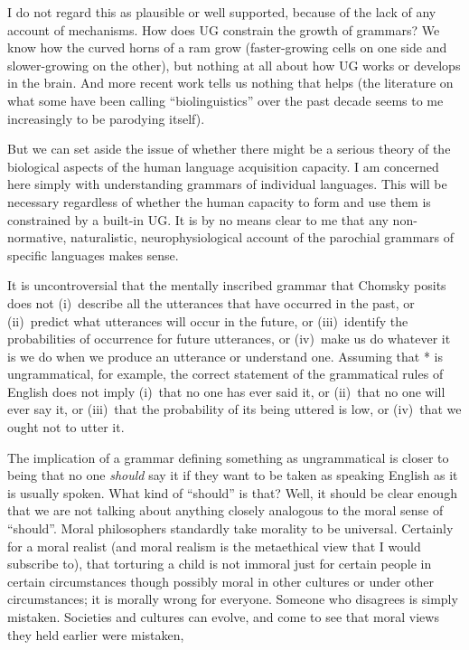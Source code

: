 \documentclass[output=paper]{langscibook}
\begin{document}
I do not regard this as plausible or well supported, because of the lack of any account of mechanisms.  How does UG constrain the growth of grammars? We know how the curved horns of a ram grow (faster-growing cells on one side and slower-growing on the other), but nothing at all about how UG works or develops in the brain. And more recent work tells us nothing that helps (the literature on what some have been calling ``biolinguistics'' over the past decade seems to me increasingly to be parodying itself).

But we can set aside the issue of whether there might be a serious theory of the biological aspects of the human language acquisition capacity. I am concerned here simply with understanding grammars of individual languages. This will be necessary regardless of whether the human capacity to form and use them is constrained by a built-in UG.  It is by no means clear to me that any non-normative, naturalistic, neurophysiological account of the parochial grammars of specific languages makes sense.

It is uncontroversial that the mentally inscribed grammar that Chomsky posits does not (i)~describe all the utterances that have occurred in the past, or (ii)~predict what utterances will occur in the future, or (iii)~identify the probabilities of occurrence for future utterances, or (iv)~make us do whatever it is we do when we produce an utterance or understand one.  Assuming that * is ungrammatical, for example, the correct statement of the grammatical rules of English does not imply (i)~that no one has ever said it, or (ii)~that no one will ever say it, or (iii)~that the probability of its being uttered is low, or (iv)~that we ought not to utter it.

The implication of a grammar defining something as ungrammatical is closer to being that no one \emph{should} say it if they want to be taken as speaking English as it is usually spoken.  What kind of ``should'' is that? Well, it should be clear enough that we are not talking about anything closely analogous to the moral sense of ``should''.  Moral philosophers standardly take morality to be universal.  Certainly for a moral realist (and moral realism is the metaethical view that I would subscribe to), that torturing a child is not immoral just for certain people in certain circumstances though possibly moral in other cultures or under other circumstances; it is morally wrong for everyone.  Someone who disagrees is simply mistaken. Societies and cultures can evolve, and come to see that moral views they held earlier were mistaken,
\end{document}
